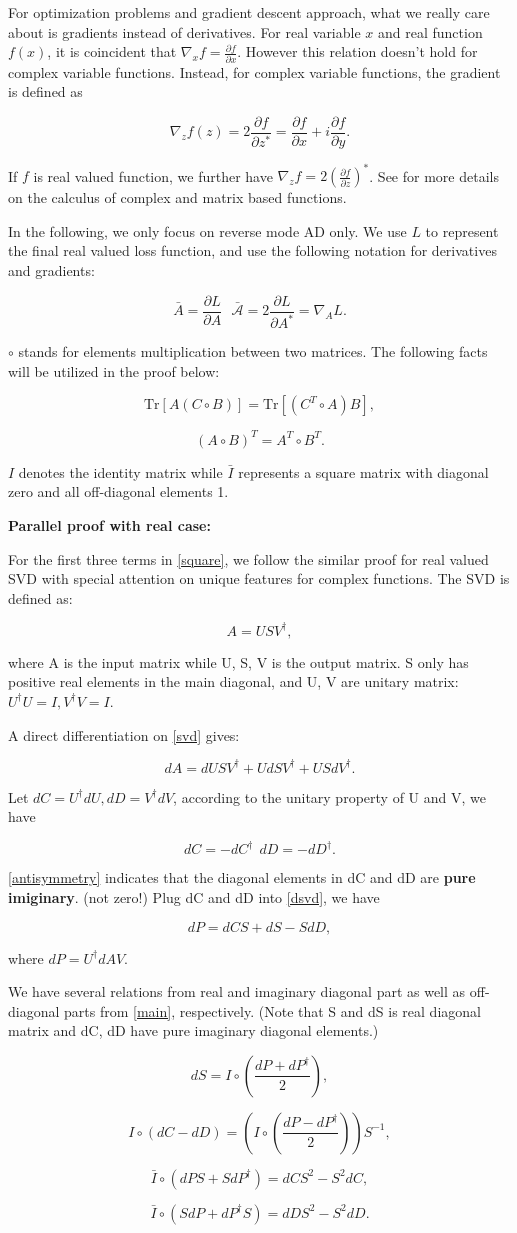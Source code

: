 \documentclass[aps,prl,singlecolumn,preprintnumbers,amsmath,amssymb,notitlepage]{revtex4-1}
\def\Tr{\mathrm{Tr}}
\newcommand{\<}{\langle}
\renewcommand{\>}{\rangle}
\newcommand{\eq}[2]{
	\begin{equation}
	#1 \label{#2}
	\end{equation}
}
\newcommand{\pf}[2]{\frac{\partial #1}{\partial #2}}
\begin{document}
For optimization problems and gradient descent approach, what we really care about is gradients instead of derivatives. For real variable $x$ and real function $f(x)$, it is coincident that $\nabla_x f = \pf{f}{x}$. However this relation doesn't hold for complex variable functions. Instead, for complex variable functions, the gradient is defined as
\eq{\nabla_z f(z)= 2\pf{f}{z^*}=\pf{f}{x}+i\pf{f}{y}.}{grad}
If $f$ is real valued function, we further have $\nabla_z f = 2(\pf{f}{z})^*$. See \cite{Hunger2007} for more details on the calculus of complex and matrix based functions.


 In the following, we only focus on reverse mode AD only. We use $L$ to represent the final real valued loss function, and use the following notation for derivatives and gradients:
 \eq{\bar{A}=\pf{L}{A}~~~\bar{\mathcal{A}}=2\pf{L}{A^*}=\nabla_AL.}{notat} 
 
 $\circ$ stands for elements multiplication between two matrices. The following facts will be utilized in the proof below:
 \eq{\Tr[A(C\circ B)]=\Tr[(C^T\circ A)B],}{arg2}
 \eq{(A\circ B)^T=A^T\circ B^T.}{arg2}
 
 $I$ denotes the identity matrix while $\bar{I}$ represents a square matrix with diagonal zero and all off-diagonal elements 1.
 
{\bf Parallel proof with real case:}

For the first three terms in \eqref{square},  we follow the similar proof for real valued SVD with special attention on unique features for complex functions. The SVD is defined as:
\eq{A=USV^\dagger,}{svd}
where A is the input matrix while U, S, V is the output matrix. S only has positive real elements in the main diagonal, and U, V are unitary matrix: $U^\dagger U=I, V^\dagger V=I$.

A direct differentiation on \eqref{svd} gives:
\eq{dA=dUSV^\dagger +UdSV^\dagger+USdV^\dagger.}{dsvd}
Let $dC=U^\dagger dU, dD=V^\dagger dV$, according to the unitary property of U and V, we have 
\eq{dC=-dC^\dagger ~~ dD=-dD^\dagger.}{antisymmetry}
\eqref{antisymmetry} indicates that the diagonal elements in dC and dD are {\bf pure imiginary}. (not zero!) Plug dC and dD into \eqref{dsvd}, we have
\eq{dP=dCS+dS-SdD,}{main}
where $dP=U^\dagger dAV$.

We have several relations from real and imaginary diagonal part as well as off-diagonal parts from \eqref{main}, respectively. (Note that S and dS is real diagonal matrix and dC, dD have pure imaginary diagonal elements.)
\eq{dS=I\circ (\frac{dP+dP^\dagger}{2}),}{dS}
\eq{I\circ(dC-dD)=(I\circ (\frac{dP-dP^\dagger}{2}))S^{-1},}{dCd}
\eq{\bar{I}\circ(dP S+S dP^\dagger)=dC S^2 - S^2 dC,}{dCo}
\eq{\bar{I}\circ(S dP+dP^\dagger S)=dD S^2 - S^2 dD.}{dDo}
\end{document}
